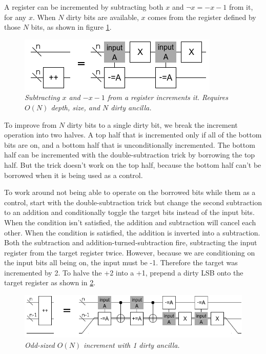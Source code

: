 \documentclass[twocolumn]{article}
\begin{document}
A register can be incremented by subtracting both $x$ and $\neg x = -x-1$ from it, for any $x$.
When $N$ dirty bits are available, $x$ comes from the register defined by those $N$ bits, as shown in figure \ref{fig:double-sub-increment}.

\begin{figure}
  \centering
  \includegraphics[totalheight=2cm]{double-sub-increment.png}
  \caption{\em Subtracting $x$ and $-x-1$ from a register increments it. Requires $O(N)$ depth, size, and $N$ dirty ancilla.}
  \label{fig:double-sub-increment}
\end{figure}

To improve from $N$ dirty bits to a single dirty bit, we break the increment operation into two halves.
A top half that is incremented only if all of the bottom bits are on, and a bottom half that is unconditionally incremented.
The bottom half can be incremented with the double-subtraction trick by borrowing the top half.
But the trick doesn't work on the top half, because the bottom half can't be borrowed when it is being used as a control.

To work around not being able to operate on the borrowed bits while them as a control, start with the double-subtraction trick but change the second subtraction to an addition and conditionally toggle the target bits instead of the input bits.
When the condition isn't satisfied, the addition and subtraction will cancel each other.
When the condition is satisfied, the addition is inverted into a subtraction.
Both the subtraction and addition-turned-subtraction fire, subtracting the input register from the target register twice.
However, because we are conditioning on the input bits all being on, the input must be -1.
Therefore the target was incremented by 2.
To halve the +2 into a +1, prepend a dirty LSB onto the target register as shown in \ref{fig:compact-increment}.

\begin{figure}
  \centering
  \includegraphics[totalheight=1.5cm]{compact-increment.png}
  \caption{\em Odd-sized $O(N)$ increment with 1 dirty ancilla.}
  \label{fig:compact-increment}
\end{figure}
\end{document}
